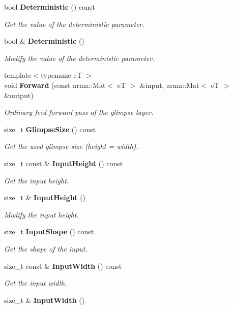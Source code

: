 \begin{DoxyCompactItemize}
bool \textbf{ Deterministic} () const
\begin{DoxyCompactList}\small\item\em Get the value of the deterministic parameter. \end{DoxyCompactList}\item 
bool \& \textbf{ Deterministic} ()
\begin{DoxyCompactList}\small\item\em Modify the value of the deterministic parameter. \end{DoxyCompactList}\item 
{\footnotesize template$<$typename eT $>$ }\\void \textbf{ Forward} (const arma\+::\+Mat$<$ eT $>$ \&input, arma\+::\+Mat$<$ eT $>$ \&output)
\begin{DoxyCompactList}\small\item\em Ordinary feed forward pass of the glimpse layer. \end{DoxyCompactList}\item 
size\+\_\+t \textbf{ Glimpse\+Size} () const
\begin{DoxyCompactList}\small\item\em Get the used glimpse size (height = width). \end{DoxyCompactList}\item 
size\+\_\+t const  \& \textbf{ Input\+Height} () const
\begin{DoxyCompactList}\small\item\em Get the input height. \end{DoxyCompactList}\item 
size\+\_\+t \& \textbf{ Input\+Height} ()
\begin{DoxyCompactList}\small\item\em Modify the input height. \end{DoxyCompactList}\item 
size\+\_\+t \textbf{ Input\+Shape} () const
\begin{DoxyCompactList}\small\item\em Get the shape of the input. \end{DoxyCompactList}\item 
size\+\_\+t const  \& \textbf{ Input\+Width} () const
\begin{DoxyCompactList}\small\item\em Get the input width. \end{DoxyCompactList}\item 
size\+\_\+t \& \textbf{ Input\+Width} ()

\end{DoxyCompactItemize}
